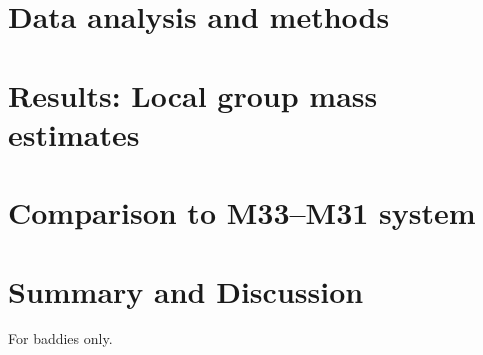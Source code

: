 \documentclass[modern]{aastex631}
\begin{document}
\section{Data analysis and methods}
\label{sec:methods}


\section{Results: Local group mass estimates}
\label{sec:results}


\section{Comparison to M33--M31 system}
\label{sec:results}


\section{Summary and Discussion}
\label{sec:discussion}



\appendix
For baddies only.

{}

\end{document}
